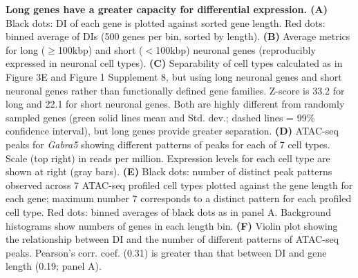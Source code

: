 \textbf{Long genes have a greater capacity for differential expression. (A)} Black dots: DI of each gene is plotted against sorted gene length. Red dots: binned average of DIs (500 genes per bin, sorted by length). \textbf{(B)} Average metrics for long ($\geq$100kbp) and short ($<$100kbp) neuronal genes (reproducibly expressed in neuronal cell types). \textbf{(C)} Separability of cell types calculated as in Figure 3E and Figure 1 Supplement 8, but using long neuronal genes and short neuronal genes rather than functionally defined gene families. Z-score is 33.2 for long and 22.1 for short neuronal genes. Both are highly different from randomly sampled genes (green solid lines mean and Std. dev.; dashed lines = 99\% confidence interval), but long genes provide greater separation. \textbf{(D)} ATAC-seq peaks for \textit{Gabra5} showing different patterns of peaks for each of 7 cell types. Scale (top right) in reads per million. Expression levels for each cell type are shown at right (gray bars). \textbf{(E)} Black dots: number of distinct peak patterns observed across 7 ATAC-seq profiled cell types plotted against the gene length for each gene; maximum number 7 corresponds to a distinct pattern for each profiled cell type. Red dots: binned averages of black dots as in panel A. Background histograms show numbers of genes in each length bin. \textbf{(F)} Violin plot showing the relationship between DI and the number of different patterns of ATAC-seq peaks. Pearson's corr. coef. (0.31) is greater than that between DI and gene length (0.19; panel A).  